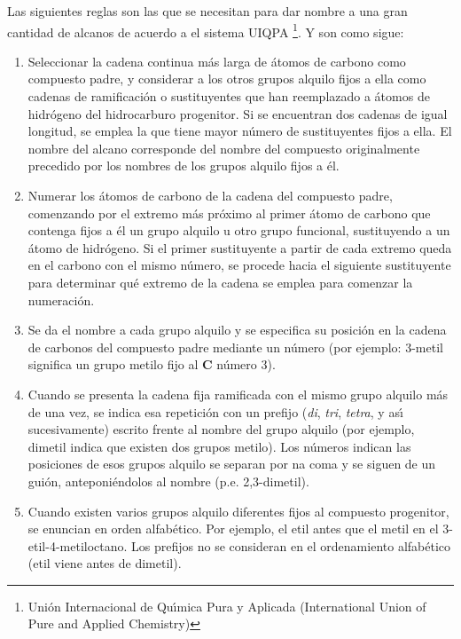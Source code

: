 Las siguientes reglas son las que se necesitan para dar
nombre a una gran cantidad de alcanos de acuerdo a el sistema
\gls{UIQPA} \footnote{Uni\'on Internacional de Qu\'{\i}mica Pura y Aplicada (International Union of Pure and Applied Chemistry)}. Y
son como sigue:
\begin{enumerate}
\item Seleccionar la cadena continua m\'as larga de \'atomos de carbono como compuesto
padre, y considerar a los otros grupos alquilo fijos a ella como cadenas de
ramificaci\'on o sustituyentes que han reemplazado a \'atomos de hidr\'ogeno del
hidrocarburo progenitor. Si se encuentran dos cadenas de igual longitud, se emplea la
que tiene mayor n\'umero de sustituyentes fijos a ella. El nombre del alcano
corresponde del nombre del compuesto originalmente precedido por los nombres de los
grupos alquilo fijos a \'el.
\item Numerar los \'atomos de carbono de la cadena del compuesto padre, comenzando por el
extremo m\'as pr\'oximo al primer \'atomo de carbono que contenga fijos a \'el un grupo
alquilo u otro grupo funcional, sustituyendo a  un \'atomo de hidr\'ogeno. Si el primer
sustituyente a partir de cada extremo queda en el carbono con el mismo n\'umero, se
procede hacia el siguiente sustituyente para determinar qu\'e extremo de la cadena se
emplea para comenzar la numeraci\'on.
\item Se da el nombre a cada grupo alquilo y se especifica su posici\'on en la cadena
de carbonos del compuesto padre mediante un n\'umero (por ejemplo: 3-metil significa un
grupo metilo fijo al \textbf{C} n\'umero 3).
\item Cuando se presenta la cadena fija ramificada con el mismo grupo  alquilo m\'as de
una vez, se indica esa repetici\'on con un prefijo (\textit{di}, \textit{tri},
\textit{tetra}, y as\'{\i} sucesivamente) escrito frente  al nombre del grupo alquilo
(por ejemplo, dimetil indica que existen dos grupos metilo).  Los n\'umeros indican las
posiciones de esos grupos alquilo se separan por na coma y se siguen de un gui\'on,
anteponi\'endolos al nombre (p.e. 2,3-dimetil).
\item Cuando existen varios grupos alquilo diferentes fijos al compuesto progenitor, se
enuncian en orden alfab\'etico. Por ejemplo, el etil antes que el metil en el
3-etil-4-metiloctano. Los prefijos no se consideran en el ordenamiento alfab\'etico
(etil viene antes de dimetil).
\end{enumerate}

